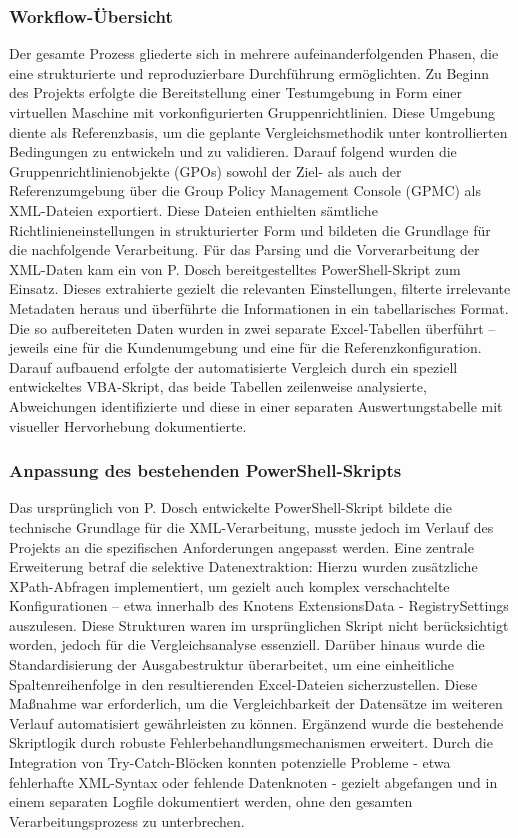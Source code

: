 \subsubsection{Workflow-Übersicht}
    Der gesamte Prozess gliederte sich in mehrere aufeinanderfolgenden Phasen, die eine strukturierte und reproduzierbare Durchführung ermöglichten. Zu Beginn des Projekts erfolgte die Bereitstellung einer Testumgebung in Form einer virtuellen Maschine mit vorkonfigurierten Gruppenrichtlinien. Diese Umgebung diente als Referenzbasis, um die geplante Vergleichsmethodik unter kontrollierten Bedingungen zu entwickeln und zu validieren.\newline 
    Darauf folgend wurden die Gruppenrichtlinienobjekte (GPOs) sowohl der Ziel- als auch der Referenzumgebung über die Group Policy Management Console (GPMC) als XML-Dateien exportiert. Diese Dateien enthielten sämtliche Richtlinieneinstellungen in strukturierter Form und bildeten die Grundlage für die nachfolgende Verarbeitung.\newline
    Für das Parsing und die Vorverarbeitung der XML-Daten kam ein von P. Dosch bereitgestelltes PowerShell-Skript zum Einsatz. Dieses extrahierte gezielt die relevanten Einstellungen, filterte irrelevante Metadaten heraus und überführte die Informationen in ein tabellarisches Format.\newline 
    Die so aufbereiteten Daten wurden in zwei separate Excel-Tabellen überführt – jeweils eine für die Kundenumgebung und eine für die Referenzkonfiguration. Darauf aufbauend erfolgte der automatisierte Vergleich durch ein speziell entwickeltes VBA-Skript, das beide Tabellen zeilenweise analysierte, Abweichungen identifizierte und diese in einer separaten Auswertungstabelle mit visueller Hervorhebung dokumentierte.
\subsubsection{Anpassung des bestehenden PowerShell-Skripts}
    Das ursprünglich von P. Dosch entwickelte PowerShell-Skript bildete die technische Grundlage für die XML-Verarbeitung, musste jedoch im Verlauf des Projekts an die spezifischen Anforderungen angepasst werden. Eine zentrale Erweiterung betraf die selektive Datenextraktion: Hierzu wurden zusätzliche XPath-Abfragen implementiert, um gezielt auch komplex verschachtelte Konfigurationen – etwa innerhalb des Knotens ExtensionsData - RegistrySettings auszulesen. Diese Strukturen waren im ursprünglichen Skript nicht berücksichtigt worden, jedoch für die Vergleichsanalyse essenziell.\newline 
    Darüber hinaus wurde die Standardisierung der Ausgabestruktur überarbeitet, um eine einheitliche Spaltenreihenfolge in den resultierenden Excel-Dateien sicherzustellen. Diese Maßnahme war erforderlich, um die Vergleichbarkeit der Datensätze im weiteren Verlauf automatisiert gewährleisten zu können. Ergänzend wurde die bestehende Skriptlogik durch robuste Fehlerbehandlungsmechanismen erweitert. Durch die Integration von Try-Catch-Blöcken konnten potenzielle Probleme - etwa fehlerhafte XML-Syntax oder fehlende Datenknoten - gezielt abgefangen und in einem separaten Logfile dokumentiert werden, ohne den gesamten Verarbeitungsprozess zu unterbrechen.
